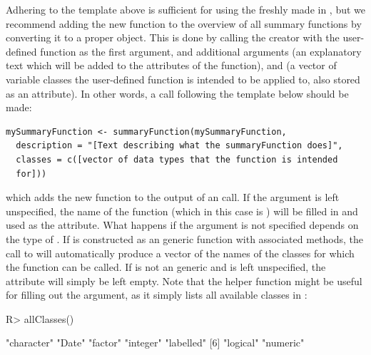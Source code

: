 \documentclass[article,shortnames]{jss}
\newcommand{\hl}[1]{\textcolor{magenta}{#1}}
\begin{document}
Adhering to the template above is sufficient for using the freshly
made  in , but we recommend
adding the new function to the overview of all summary
functions by converting it to a proper 
object. This is done by calling the  creator with
the user-defined function as the first argument, and additional arguments
 (an explanatory text which will be added to the attributes of
the function), and  (a vector of variable classes the
user-defined function is intended to be applied to, also stored as an
attribute). In other words, a call following the template below should be made:
\begin{Verbatim}
mySummaryFunction <- summaryFunction(mySummaryFunction,
  description = "[Text describing what the summaryFunction does]",
  classes = c([vector of data types that the function is intended
  for]))
\end{Verbatim}
which adds the new function to the output of an
 call.
If the  argument is left unspecified, the name of
the function (which in this case is ) will
be filled in and used as the  attribute. What
happens if the  argument is not specified depends on the
type of . If  is
constructed as an  generic function with associated methods,
the call to  will automatically produce a
vector of the names of the classes for which the function can be
called. If  is not an  generic and
 is left unspecified, the attribute will simply be left
empty. Note that the helper function  might be
useful for filling out the  argument, as it simply lists
all available classes in :

\begin{Schunk}
\begin{Sinput}
R> allClasses()
\end{Sinput}
\begin{Soutput}
[1] "character" "Date"      "factor"    "integer"   "labelled" 
[6] "logical"   "numeric"  
\end{Soutput}
\end{Schunk}

\end{document}
